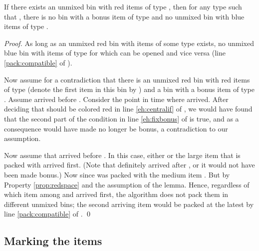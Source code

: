 \begin{invariant}
\label{inv:unmixed}
If there exists an unmixed bin with red items of type ,
then for any type  such that , 
there is no bin with a bonus item of type   
and no unmixed bin with blue items of type .
\end{invariant}
\begin{proof}
As long as an unmixed red bin
with items of some type  exists, no unmixed blue bin with items of type  for which
 can be opened and vice versa (line \ref{pack:compatible} of \Pack).

Now assume for a contradiction that there is an unmixed red bin with red items of type  (denote the first item in this bin by ) and a bin with a bonus item  of type .
Assume  arrived before . Consider the point in time where  arrived. After deciding that  should be colored red in line \ref{eh:centralif} of \EHarm, we would have found that the second part of the condition in line \ref{eh:fixbonus}  of {\EHarm} is true, and as a consequence would have made  no longer be bonus, a contradiction to our assumption.

Now assume that  arrived before . In this case, either  or the large item  that is packed with  arrived first. (Note that  definitely arrived after , or it would not have been made bonus.)
Now  since  was packed with the medium item . But 
by Property \ref{prop:redspace} and the assumption of the lemma.
Hence, regardless of which item among  and  arrived first, the algorithm does not pack them in different unmixed bins; the second arriving item would be packed at the latest by line \ref{pack:compatible} of {\Pack}.
\qed\end{proof}




















\subsection{Marking the items}
\label{sec:mark-and-color}

